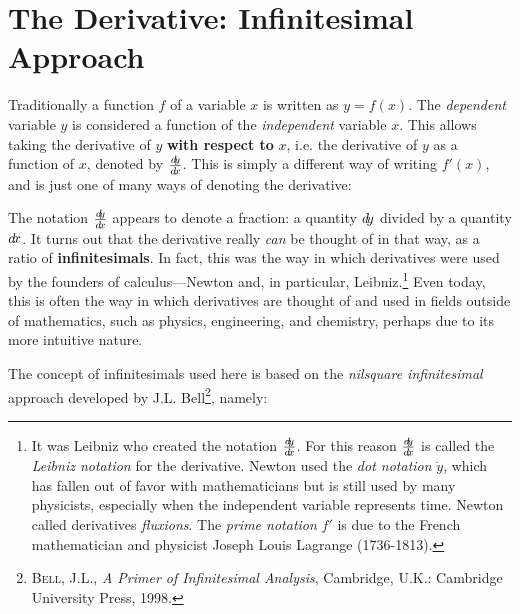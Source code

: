 \section{The Derivative: Infinitesimal Approach}\label{sec:derivative-inifinitesimal-approach}
Traditionally a function $f$ of a variable $x$ is written as $y=f(x)$. The
\emph{dependent} variable $y$ is considered a function of the \emph{independent}
variable $x$. This allows taking the derivative of $y$ \textbf{with respect to}
$x$, i.e. the derivative of $y$ as a function of $x$, denoted by
$\frac{d\negmedspace y}{d\!x}$. This is simply a different way of writing $f'(x)$, and is just one of
many ways of denoting the derivative:\index{$\dx$}


The notation $\frac{d\negmedspace y}{d\!x}$ appears to denote a fraction: a quantity $d\!y$
divided by a quantity $\dx$. It turns out that the derivative really \emph{can}
be thought of in that way, as a ratio of \textbf{infinitesimals}. In fact,
this was the way in which derivatives were used by the founders
of calculus---Newton and, in particular, Leibniz.\footnote{It was
Leibniz who created the notation $\frac{d\negmedspace y}{d\!x}$. For this reason $\frac{d\negmedspace y}{d\!x}$ is called
the \emph{Leibniz notation} for the derivative. Newton
used the \emph{dot notation} $\dot{y}$, which has fallen out of favor with
mathematicians but is still used by many physicists, especially when the
independent variable represents time. Newton called derivatives \emph{fluxions}.
The \emph{prime notation} $f'$ is due to the French mathematician and physicist
Joseph Louis Lagrange (1736-1813).} Even today, this is
often the way in which derivatives are thought of and used in fields outside of
mathematics, such as physics, engineering, and chemistry, perhaps due to its
more intuitive nature.

The concept of infinitesimals used here
is based on the \emph{nilsquare infinitesimal} approach developed by J.L.
Bell\footnote{\textsc{Bell, J.L.}, \emph{A Primer of Infinitesimal Analysis}, 
Cambridge, U.K.: Cambridge University Press, 1998.}, namely:

